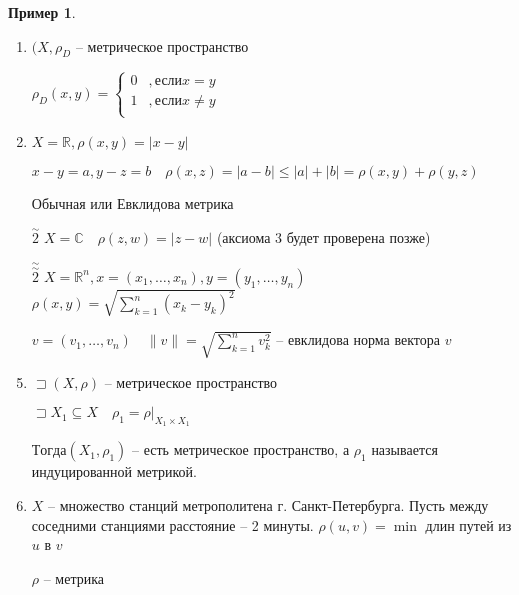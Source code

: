 \documentclass{book}
\newcommand\R{\ensuremath{\mathbb{R}}}
\renewcommand\C{\ensuremath{\mathbb{C}}}
\theoremstyle{definition}
\newtheorem*{example}{Пример}
\begin{document}
    \begin{example}
        \begin{enumerate}
            \item $(X, \rho_{D}$ -- метрическое пространство

                $\rho_D(x,y) = \begin{cases}
                    0&, \text{если} x=y\\
                    1&, \text{если} x\neq y\\
                \end{cases}$
            \item $X=\R, \rho(x,y) = |x-y|$

                $x-y = a, y-z = b\quad \rho(x,z) = |a-b|\leqslant |a| + |b| = \rho(x,y) + \rho(y,z)$

                Обычная или Евклидова метрика
            \item [$\overset{\sim }2$] $X = \C\quad \rho(z,w) = |z-w|$ (аксиома 3 будет проверена позже)
            \item [$\overset{\sim }{\overset{\sim }{2}}$]  $X = \R^n, x = (x_1, \ldots, x_{n} ), y = (y_1, \ldots, y_{n} )$ $\rho(x,y) = \sqrt{\sum_{k=1}^{n} \left( x_k-y_k \right) ^2} $

                $v = (v_1, \ldots, v_n)\quad \|v\| = \sqrt{\sum_{k=1}^{n} v_k^2} $ -- евклидова норма вектора $v$
            \item $\sqsupset (X, \rho)$ -- метрическое пространство

                $\sqsupset X_1\subseteq X\quad \rho_1 = \rho|_{X_1\times X_1}$

                $Тогда (X_1, \rho_1)$ -- есть метрическое пространство, а $\rho_1$ называется индуцированной метрикой.
            \item $X$ -- множество станций метрополитена г. Санкт-Петербурга. Пусть между соседними станциями расстояние -- 2 минуты. $\rho(u,v) = \min$ длин путей из $u$ в $v$

               $\rho$ -- метрика
        \end{enumerate}
    \end{example}
\end{document}
